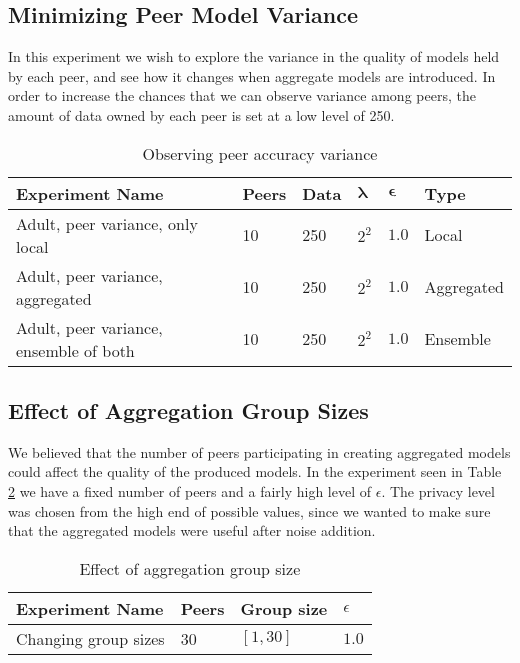 \subsection{Minimizing Peer Model Variance}

In this experiment we wish to explore the variance in the quality of models held by each peer, and see how it changes when aggregate models are introduced. In order to increase the chances that we can observe variance among peers, the amount of data owned by each peer is set at a low level of 250.

\begin{table}[h]
	\centering
	\begin{tabular}{|l|l|l|l|l|l|}
		{\bf Experiment Name}                  & {\bf Peers} & {\bf Data} & $\boldsymbol{\lambda}$ & $\boldsymbol{\epsilon}$ & {\bf Type} \\
		\hline
		Adult, peer variance, only local       & 10          & 250        & $2^{2}$   & $1.0$      & Local      \\
		Adult, peer variance, aggregated       & 10          & 250        & $2^{2}$   & $1.0$      & Aggregated \\
		Adult, peer variance, ensemble of both & 10          & 250        & $2^{2}$   & $1.0$      & Ensemble  
	\end{tabular}
	\caption{Observing peer accuracy variance}
	\label{tab:experiments_peer_variance}
\end{table}

\subsection{Effect of Aggregation Group Sizes}

We believed that the number of peers participating in creating aggregated models could affect the quality of the produced models. In the experiment seen in Table \ref{tab:experiments_group_sizes} we have a fixed number of peers and a fairly high level of $\epsilon$. The privacy level was chosen from the high end of possible values, since we wanted to make sure that the aggregated models were useful after noise addition.

\begin{table}[h]
	\centering
	
	\begin{tabular}{|l|l|l|l|}
		{\bf Experiment Name} & {\bf Peers} & {\bf Group size} & $\epsilon$ \\
		\hline
		Changing group sizes  & 30          & $[1, 30]$      &     $1.0$     \\ 
	\end{tabular}
	\caption{Effect of aggregation group size}
	\label{tab:experiments_group_sizes}
\end{table}
 

